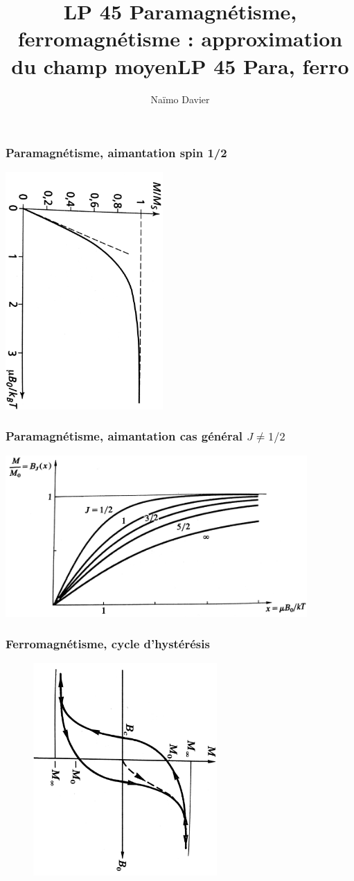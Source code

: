 \documentclass{beamer}
\title{LP 45 Paramagnétisme, ferromagnétisme : approximation du champ moyen}
\author{Naïmo Davier}
\institute{Université Paul sabatier}
\begin{document}
	
\begin{frame}
	\titlepage
\end{frame}

\addtocounter{framenumber}{-1}
\title{LP 45 Para, ferro}

\begin{frame}
\frametitle{Paramagnétisme, aimantation spin 1/2}
\centerline{\includegraphics[width=6cm,angle=90]{para}}
\end{frame}

\begin{frame}
\frametitle{Paramagnétisme, aimantation cas général $J\neq1/2$}
\centerline{\includegraphics[width=11.5cm]{cas_j_n0,5}}
\end{frame}

\begin{frame}
\frametitle{Ferromagnétisme, cycle d'hystérésis}
\begin{figure}[h]
	\centerline{\includegraphics[width=7cm, angle=90]{hysteresis}}
\end{figure}
\end{frame}
\end{document}
